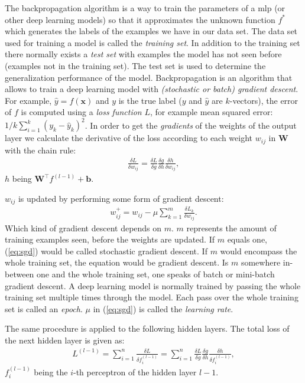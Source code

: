 \documentclass[]{article}
\begin{document}
The backpropagation algorithm is a way to train the parameters of a
\acrshort{mlp} (or other deep learning models) so that it approximates the
unknown function $f^*$ which generates the labels of the examples
we have in our data set.
The data set used for training a model is called the \textit{training
set}.
In addition to the training set there normally exists a
\textit{test set} with examples the model has not seen before
(examples not in the training set).
The test set is used to determine the generalization performance of
the model.
Backpropagation is an algorithm that allows to train a deep learning
model with \textit{(stochastic or batch) gradient descent}.
For example, $\hat{y} = f(\mathbf{x})$ and $y$ is the true label
($y$ and $\hat{y}$ are $k$-vectors), the error of $f$ is computed
using a \textit{loss function} $L$, for example mean squared error:
$1/k \sum_{i=1}^{k}(y_k - \hat{y}_k)^2$.
In order to get the \textit{gradients} of the weights of the output
layer we calculate the derivative of the loss according to each weight
$w_{ij}$ in $\mathbf{W}$ with the chain rule:
\begin{align}
  \label{eq:chain_rule}
  \frac{\delta L}{\delta w_{ij}} =
    \frac{\delta L}{\delta g}
    \frac{\delta g}{\delta h}
    \frac{\delta h}{\delta w_{ij}},
\end{align}
$h$ being $\mathbf{W}^\top f^{(l-1)} + \mathbf{b}$.

$w_{ij}$ is updated by performing some form of gradient descent:
\begin{align}
  \label{eq:sgd}
  w_{ij}^+ = w_{ij} - \mu \sum_{k=1}^{m} \frac{\delta L_k}{\delta w_{ij}}.
\end{align}
Which kind of gradient descent depends on $m$.
$m$ represents the amount of training examples seen, before the
weights are updated.
If $m$ equals one, (\ref{eq:sgd}) would be called stochastic gradient
descent.
If $m$ would encompass the whole training set, the equation would
be gradient descent.
Is $m$ somewhere in-between one and the whole training set, one
speaks of batch or mini-batch gradient descent.
A deep learning model is normally trained by passing the whole
training set multiple times through the model.
Each pass over the whole training set is called an \textit{epoch}.
$\mu$ in (\ref{eq:sgd}) is called the \textit{learning rate}.

The same procedure is applied to the following hidden layers.
The total loss of the next hidden layer is given as:
\begin{align}
  L^{(l-1)} = \sum_{i=1}^n\frac{\delta L}{\delta f^{(l - 1)}_i} =
  \sum_{i=1}^n\frac{\delta L}{\delta g}
    \frac{\delta g}{\delta h}
    \frac{\delta h}{\delta f^{(l - 1)}_i},
\end{align}
$f^{(l-1)}_i$ being the $i$-th perceptron of the hidden layer $l-1$.
\end{document}

